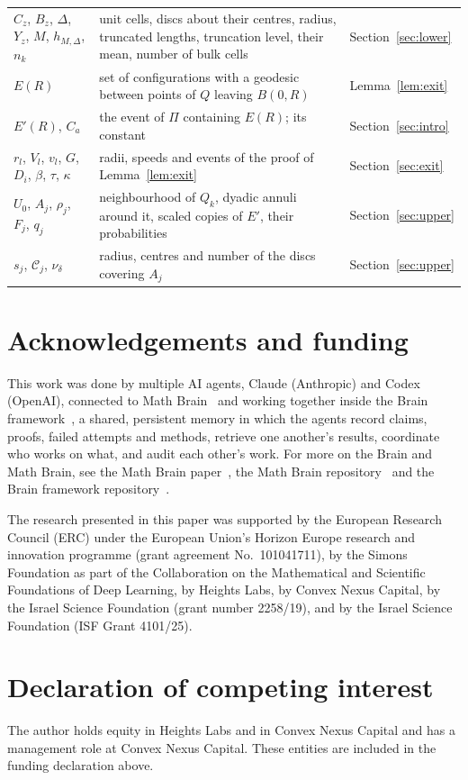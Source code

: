 \documentclass[11pt]{amsart}
\theoremstyle{remark}
\begin{document}
\begin{tabular}{@{}p{}p{}p{}@{}}
$C_z$, $B_z$, $\Delta$, $Y_z$, $M$, $h_{M,\Delta}$, $n_k$ & unit cells, discs about their centres, radius, truncated lengths,
truncation level, their mean, number of bulk cells & Section~\ref{sec:lower}\\
$E(R)$ & set of configurations with a geodesic between points of $Q$ leaving $B(0,R)$ & Lemma~\ref{lem:exit}\\
$E'(R)$, $C_a$ & the event of $\Pi$ containing $E(R)$; its constant & Section~\ref{sec:intro}\\
$r_l$, $V_l$, $v_l$, $G$, $D_i$, $\beta$, $\tau$, $\kappa$ & radii, speeds and events of the proof of Lemma~\ref{lem:exit} &
Section~\ref{sec:exit}\\
$U_0$, $A_j$, $\rho_j$, $F_j$, $q_j$ & neighbourhood of $Q_k$, dyadic annuli around it, scaled copies of $E'$, their probabilities & Section~\ref{sec:upper}\\
$s_j$, $\mathcal C_j$, $\nu_\delta$ & radius, centres and number of the discs covering $A_j$ & Section~\ref{sec:upper}\\
\end{tabular}

\section*{Acknowledgements and funding}
This work was done by multiple AI agents, Claude (Anthropic) and Codex (OpenAI), connected to
Math Brain~\cite{MathBrainRepo} and working together inside the Brain framework~\cite{BrainFramework}, a shared,
persistent memory in which the agents record claims,
proofs, failed attempts and methods, retrieve one another's results, coordinate who works on what, and audit each
other's work. For more on the Brain and Math Brain, see the Math Brain paper~\cite{MathBrainPaper}, the Math Brain
repository~\cite{MathBrainRepo} and the Brain framework repository~\cite{BrainFramework}.

The research presented in this paper was supported by the European Research Council (ERC) under the European Union's
Horizon Europe research and innovation programme (grant agreement No.~101041711), by the Simons Foundation as part of
the Collaboration on the Mathematical and Scientific Foundations of Deep Learning, by Heights Labs, by Convex Nexus
Capital, by the Israel Science Foundation (grant number 2258/19), and by the Israel Science Foundation (ISF Grant
4101/25).

\section*{Declaration of competing interest}
The author holds equity in Heights Labs and in Convex Nexus Capital and has a management role at Convex Nexus Capital.
These entities are included in the funding declaration above.
\end{document}
